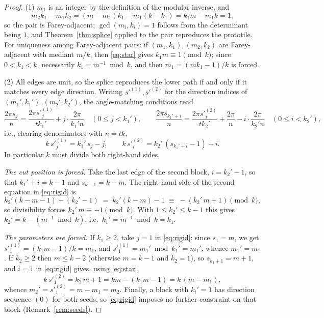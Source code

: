 \documentclass[10pt,a4paper]{amsart}
\begin{document}
\begin{proof}
(1) $m_1$ is an integer by the definition of the modular inverse, and
\[
m_2k_1-m_1k_2=(m-m_1)k_1-m_1(k-k_1)=k_1m-m_1k=1,
\]
so the pair is Farey-adjacent; $\gcd(m_i,k_i)=1$ follows from the determinant being $1$,
and Theorem~\ref{thm:splice} applied to the pair reproduces the prototile. For
uniqueness among Farey-adjacent pairs: if $(m_1,k_1),(m_2,k_2)$ are Farey-adjacent with
mediant $m/k$, then \eqref{eq:star} gives $k_1m\equiv 1 \pmod k$; since $0<k_1<k$,
necessarily $k_1=m^{-1}\bmod k$, and then $m_1=(mk_1-1)/k$ is forced.

(2) All edges are unit, so the splice reproduces the lower path if and only if it matches
every edge direction. Writing $s'^{(1)},s'^{(2)}$ for the direction indices of
$(m_1',k_1'),(m_2',k_2')$, the angle-matching conditions read
\[
\frac{2\pi s_j}{n}=\frac{2\pi s'^{(1)}_j}{t k_1'}+j\cdot\frac{2\pi}{k_1' n}
\quad(0\le j< k_1'),
\qquad
\frac{2\pi s_{k_1'+i}}{n}=\frac{2\pi s'^{(2)}_i}{t k_2'}+\frac{2\pi}{n}
-i\cdot\frac{2\pi}{k_2' n}
\quad(0\le i< k_2'),
\]
i.e., clearing denominators with $n=tk$,
\begin{equation}
k\,s'^{(1)}_j = k_1'\,s_j - j,
\qquad
k\,s'^{(2)}_i = k_2'\,(s_{k_1'+i}-1) + i.
\tag{$\dagger$}\label{eq:rigid}
\end{equation}
In particular $k$ must divide both right-hand sides.

\emph{The cut position is forced.} Take the last edge of the second block,
$i=k_2'-1$, so that $k_1'+i=k-1$ and $s_{k-1}=k-m$. The right-hand side of the second
equation in \eqref{eq:rigid} is
\[
k_2'(k-m-1)+(k_2'-1) \;=\; k_2'(k-m)-1 \;\equiv\; -(k_2'\,m+1) \pmod k,
\]
so divisibility forces $k_2'\,m\equiv-1\pmod k$. With $1\le k_2'\le k-1$ this gives
$k_2'=k-(m^{-1}\bmod k)$, i.e.\ $k_1'=m^{-1}\bmod k=k_1$.

\emph{The parameters are forced.} If $k_1\ge2$, take $j=1$ in \eqref{eq:rigid}: since
$s_1=m$, we get $s'^{(1)}_1=(k_1m-1)/k=m_1$, and $s'^{(1)}_1=m_1'\bmod k_1'=m_1'$,
whence $m_1'=m_1$. If $k_2\ge2$ then $m\le k-2$ (otherwise $m=k-1$ and $k_2=1$), so
$s_{k_1+1}=m+1$, and $i=1$ in \eqref{eq:rigid} gives, using \eqref{eq:star},
\[
k\,s'^{(2)}_1 = k_2\,m+1 = km-(k_1m-1) = k\,(m-m_1),
\]
whence $m_2'=s'^{(2)}_1=m-m_1=m_2$. Finally, a block with $k_i'=1$ has direction
sequence $(0)$ for both seeds, so \eqref{eq:rigid} imposes no further constraint on that
block (Remark~\ref{rem:seeds}).
\end{proof}
\end{document}
